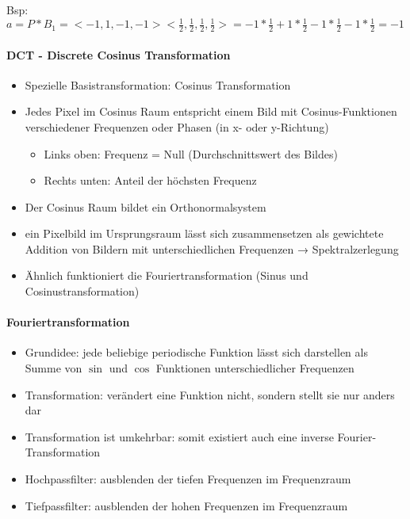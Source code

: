 \documentclass[10pt,landscape]{article}
\begin{document}
\begin{multicols}{3}
Bsp: $a=P*B_1 = <-1, 1, -1, -1><\frac{1}{2}, \frac{1}{2}, \frac{1}{2}, \frac{1}{2}> = -1*\frac{1}{2}+1*\frac{1}{2}-1*\frac{1}{2}-1*\frac{1}{2} = -1$


\paragraph{DCT - Discrete Cosinus Transformation}
\begin{itemize}
  \item Spezielle Basistransformation: Cosinus Transformation
  \item Jedes Pixel im Cosinus Raum entspricht einem Bild mit Cosinus-Funktionen verschiedener Frequenzen oder Phasen (in x- oder y-Richtung)
        \begin{itemize}
          \item Links oben: Frequenz = Null (Durchschnittswert des Bildes)
          \item Rechts unten: Anteil der höchsten Frequenz
        \end{itemize}
  \item Der Cosinus Raum bildet ein Orthonormalsystem
  \item ein Pixelbild im Ursprungsraum lässt sich zusammensetzen als gewichtete Addition von Bildern mit unterschiedlichen Frequenzen → Spektralzerlegung
  \item Ähnlich funktioniert die Fouriertransformation (Sinus und Cosinustransformation)
\end{itemize}


\paragraph{Fouriertransformation}
\begin{itemize}
  \item Grundidee: jede beliebige periodische Funktion lässt sich darstellen als Summe von $\sin$ und $\cos$ Funktionen unterschiedlicher Frequenzen
  \item Transformation: verändert eine Funktion nicht, sondern stellt sie nur anders dar
  \item Transformation ist umkehrbar: somit existiert auch eine inverse Fourier-Transformation
  \item Hochpassfilter: ausblenden der tiefen Frequenzen im Frequenzraum
  \item Tiefpassfilter: ausblenden der hohen Frequenzen im Frequenzraum
\end{itemize}



\end{multicols}
\end{document}
